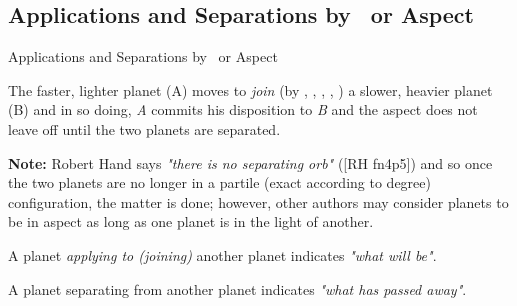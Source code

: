 \subsection{Applications and Separations by \Conjunction\ or Aspect}

\begin{frame}[t]{Applications and Separations by \Conjunction\ or Aspect}
\begin{block}{}
The faster, lighter planet (A) moves to \textsl{join} (by \Conjunction, \Sextile, \Square, \Trine, \Opposition) a slower, heavier planet (B) and in so doing, \textsl{A} commits his disposition to \textsl{B} and the aspect does not leave off until the two planets are separated.
\end{block}

\begin{mdframed}[backgroundcolor=gray!5, rightmargin=2em, leftmargin=2em]
\textbf{Note:} Robert Hand says \textsl{"there is no separating orb"} ([RH fn4p5]) and so once the two planets are no longer in a partile (exact according to degree) configuration, the matter is done; however, other authors may consider planets to be in aspect as long as one planet is in the light of another.\footnotemark[1]
\end{mdframed}

\begin{block}{}
A planet \textsl{applying to (joining)} another planet indicates \textsl{"what will be"}. 
\end{block}

\begin{block}{}
A planet separating from another planet indicates \textsl{"what has passed away"}.
\end{block}


\end{frame}